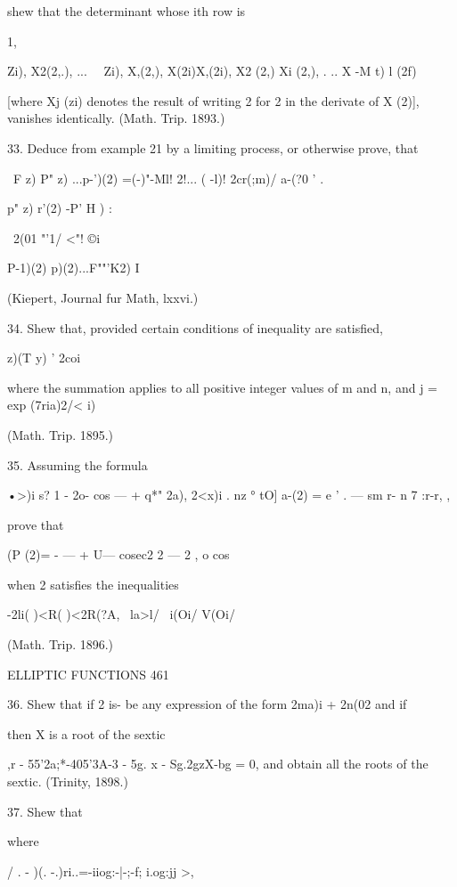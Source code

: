 {shew that the determinant whose ith row is 

1, \ \ {Zi), X2(2,.), ... \ \   Zi), X,(2,), X(2i)X,(2i), X2 (2,) Xi (2,), . .. X -M t)  l (2f) 

[where Xj (zi) denotes the result of writing 2  for 2 in the derivate of X (2)], vanishes 
identically. (Math. Trip. 1893.) 

33. Deduce from example 21 by a limiting process, or otherwise prove, that 

\ F z) P" z) ...p-')(2) =(-)"-Ml! 2!... ( -l)! 2cr(;m)/ a-(?0 ' . 

p" z) r'(2) -P' H ) : 



\ 2(01  "'1/ <"! ©i 



P-1)(2) p)(2)...F""'K2) I 

(Kiepert, Journal fur Math, lxxvi.) 

34. Shew that, provided certain conditions of inequality are satisfied, 

  z)(T y)  ' 2coi 

where the summation applies to all positive integer values of m and n, and j = exp (7ria)2/< i) 

(Math. Trip. 1895.) 

35. Assuming the formula 

•>)i s?   1 - 2o-  cos — + q*" 
2a), 2<x)i . nz °  tO] 
a-(2) = e ' . —  sm r- n 7  :r-r, , 

prove that 

(P (2)= - — + U— cosec2 2 — 2 ,   o  cos 

when 2 satisfies the inequalities 

-2li( )<R( )<2R(?A, 
\ la>l/ \ i(Oi/ V(Oi/ 

(Math. Trip. 1896.) 



ELLIPTIC FUNCTIONS 461 

36. Shew that if 2 is- be any expression of the form 2ma)i + 2n(02 and if 

then X is a root of the sextic 

,r - 55'2a;*-405'3A-3 - 5g. x  - Sg.2gzX-bg  = 0, 
and obtain all the roots of the sextic. (Trinity, 1898.) 

37. Shew that 



where 



/ . - )(. -.)ri..=-iiog:-|-;-f; i.og:jj >, 



}}
